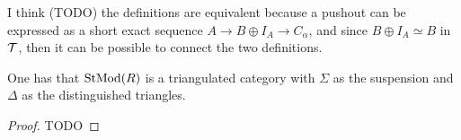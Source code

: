 \begin{remark} %
    I think (TODO) the definitions are equivalent because a pushout can be expressed as a short exact sequence \( A \to B \oplus I_A \to C_\alpha \), and since \( B \oplus I_A \simeq B \) in \( {\mathcal{T}} \), then it can be possible to connect the two definitions. 
\end{remark}

\begin{theorem}
    One has that \( \operatorname{StMod}(R) \) is a triangulated category with \( \Sigma \) as the suspension and \( \Delta \) as the distinguished triangles.
\end{theorem}
\begin{proof}
    TODO
\end{proof}
